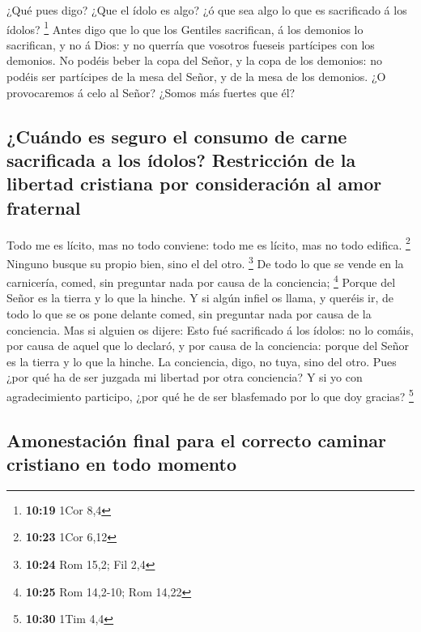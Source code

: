  ¿Qué pues digo? ¿Que el ídolo es algo? ¿ó que sea algo lo
que es sacrificado á los ídolos? \footnote{\textbf{10:19} 1Cor 8,4}
 Antes digo que lo que los Gentiles sacrifican, á los
demonios lo sacrifican, y no á Dios: y no querría que vosotros fueseis
partícipes con los demonios.  No podéis beber la copa del
Señor, y la copa de los demonios: no podéis ser partícipes de la mesa
del Señor, y de la mesa de los demonios.  ¿O provocaremos á
celo al Señor? ¿Somos más fuertes que él?

\hypertarget{cuuxe1ndo-es-seguro-el-consumo-de-carne-sacrificada-a-los-uxeddolos-restricciuxf3n-de-la-libertad-cristiana-por-consideraciuxf3n-al-amor-fraternal}{%
\subsection{¿Cuándo es seguro el consumo de carne sacrificada a los
ídolos? Restricción de la libertad cristiana por consideración al amor
fraternal}\label{cuuxe1ndo-es-seguro-el-consumo-de-carne-sacrificada-a-los-uxeddolos-restricciuxf3n-de-la-libertad-cristiana-por-consideraciuxf3n-al-amor-fraternal}}

 Todo me es lícito, mas no todo conviene: todo me es
lícito, mas no todo edifica. \footnote{\textbf{10:23} 1Cor 6,12}
 Ninguno busque su propio bien, sino el del otro.
\footnote{\textbf{10:24} Rom 15,2; Fil 2,4}  De todo lo que
se vende en la carnicería, comed, sin preguntar nada por causa de la
conciencia; \footnote{\textbf{10:25} Rom 14,2-10; Rom 14,22}
 Porque del Señor es la tierra y lo que la hinche.
 Y si algún infiel os llama, y queréis ir, de todo lo que
se os pone delante comed, sin preguntar nada por causa de la conciencia.
 Mas si alguien os dijere: Esto fué sacrificado á los
ídolos: no lo comáis, por causa de aquel que lo declaró, y por causa de
la conciencia: porque del Señor es la tierra y lo que la hinche.
 La conciencia, digo, no tuya, sino del otro. Pues ¿por qué
ha de ser juzgada mi libertad por otra conciencia?  Y si yo
con agradecimiento participo, ¿por qué he de ser blasfemado por lo que
doy gracias? \footnote{\textbf{10:30} 1Tim 4,4}

\hypertarget{amonestaciuxf3n-final-para-el-correcto-caminar-cristiano-en-todo-momento}{%
\subsection{Amonestación final para el correcto caminar cristiano en
todo
momento}\label{amonestaciuxf3n-final-para-el-correcto-caminar-cristiano-en-todo-momento}}

